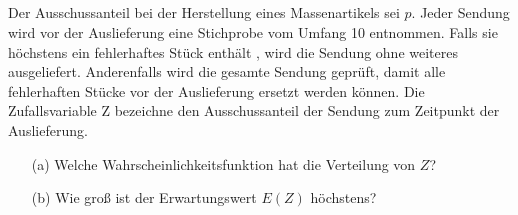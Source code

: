 \documentclass[ngerman]{scrartcl}
\begin{document}
\subsection{}
Der Ausschussanteil bei der Herstellung eines Massenartikels sei $p$. Jeder Sendung wird vor der Auslieferung eine Stichprobe vom Umfang 10 entnommen. Falls sie höchstens ein fehlerhaftes Stück enthält , wird die Sendung ohne weiteres ausgeliefert. Anderenfalls wird die gesamte Sendung geprüft, damit alle fehlerhaften Stücke vor der Auslieferung ersetzt werden können. Die Zufallsvariable Z bezeichne den Ausschussanteil der Sendung zum Zeitpunkt der Auslieferung.
\begin{enumerate}
	\item[(a)] Welche Wahrscheinlichkeitsfunktion hat die Verteilung von $Z$?
	\item[(b)] Wie groß ist der Erwartungswert $E(Z)$ höchstens?
\end{enumerate}
\end{document}
